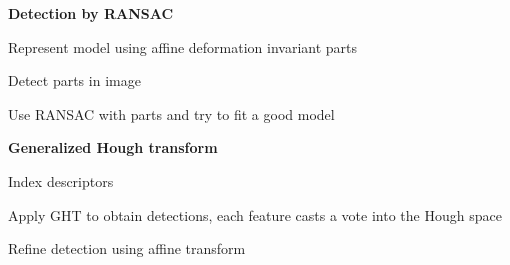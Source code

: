 \documentclass{article}
\begin{document}
\begin{multicols*}{2}
{	\textbf{Detection by RANSAC}
	\begin{compactenum}
		\item Represent model using affine deformation invariant parts
		\item Detect parts in image
		\item Use RANSAC with parts and try to fit a good model
	\end{compactenum}

	\textbf{Generalized Hough transform}
	\begin{compactenum}
		\item Index descriptors
		\item Apply GHT to obtain detections, each feature casts a vote into the Hough space
		\item Refine detection using affine transform
	\end{compactenum}

	}
\end{multicols*}
\end{document}
